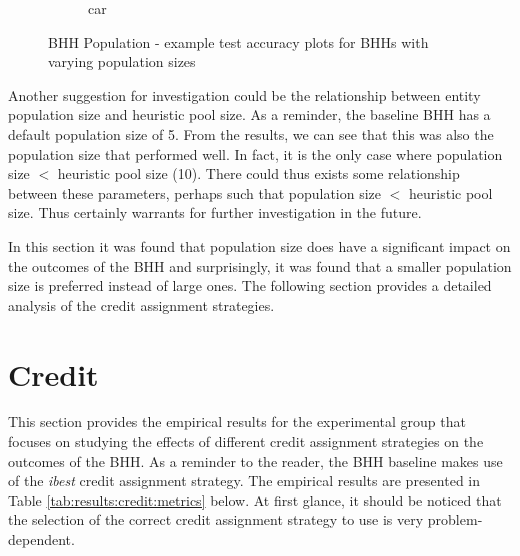 \begin{figure}[htbp]
\begin{subfigure}{0.5\textwidth}
        \caption{car}
        \label{fig:results:population:figures:accuracy2}
	\end{subfigure}
	\caption{\Acs{BHH} Population - example test accuracy plots for \Acsp{BHH} with varying population sizes}
	\label{fig:results:population:figures:accuracy}
\end{figure}

Another suggestion for investigation could be the relationship between entity population size and heuristic pool size. As a reminder, the baseline \ac{BHH} has a default population size of 5. From the results, we can see that this was also the population size that performed well. In fact, it is the only case where population size $<$ heuristic pool size (10). There could thus exists some relationship between these parameters, perhaps such that population size $ < $ heuristic pool size. Thus certainly warrants for further investigation in the future.

In this section it was found that population size does have a significant impact on the outcomes of the \Ac{BHH} and surprisingly, it was found that a smaller population size is preferred instead of large ones. The following section provides a detailed analysis of the credit assignment strategies.




\section{Credit}
\label{sec:results:credit}

This section provides the empirical results for the experimental group that focuses on studying the effects of different credit assignment strategies on the outcomes of the \Ac{BHH}. As a reminder to the reader, the \Ac{BHH} baseline makes use of the \textit{ibest} credit assignment strategy. The empirical results are presented in Table \ref{tab:results:credit:metrics} below. At first glance, it should be noticed that the selection of the correct credit assignment strategy to use is very problem-dependent.


